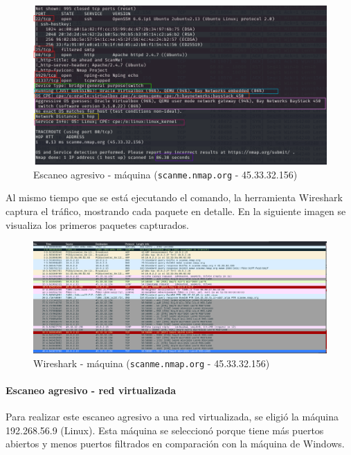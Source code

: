 \documentclass[a4paper,12pt]{article} %
\begin{document}
        \begin{figure} [hp!]
         \centering
         \includegraphics[width=1\textwidth]{Imagenes/infoSCANME.png}
         \caption{Escaneo agresivo - máquina (\texttt{scanme.nmap.org} - 45.33.32.156) }
         \label{fig:wireshark2}
        \end{figure}

\newpage
    Al mismo tiempo que se está ejecutando el comando, la herramienta Wireshark captura el tráfico, mostrando cada paquete en detalle. En la siguiente imagen se visualiza los primeros paquetes capturados.
        \begin{figure} [hp!]
         \centering
         \includegraphics[width=1\textwidth]{Imagenes/wireMaquina.png}
         \caption{Wireshark - máquina (\texttt{scanme.nmap.org} - 45.33.32.156) }
         \label{fig:wireshark2}
        \end{figure}

\paragraph{Escaneo agresivo - red virtualizada }
 Para realizar este escaneo agresivo a una red virtualizada, se eligió la máquina 192.268.56.9 (Linux). Esta máquina se seleccionó porque tiene más puertos abiertos y menos puertos filtrados en comparación con la máquina de Windows.
        
\end{document}
